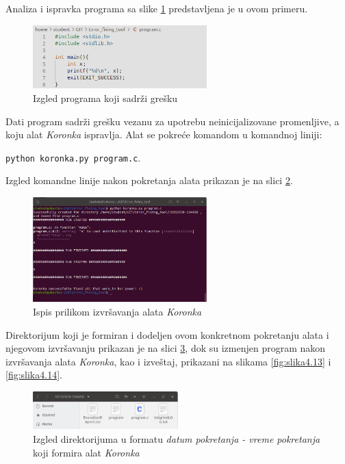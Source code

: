 \documentclass[12pt,oneside]{memoir}
\theoremstyle{plain}
\theoremstyle{definition}
\begin{document}
Analiza i ispravka programa sa slike \ref{fig:slika4.15} predstavljena je u ovom primeru. 

\begin{figure}[!ht]
  \centering
  \includegraphics[width=0.6\textwidth]{ProgramWithError.png}
  \caption{Izgled programa koji sadrži grešku}
  \label{fig:slika4.15}
\end{figure}

Dati program sadrži grešku vezanu za upotrebu neinicijalizovane promenljive, a koju alat \textit{Koronka} ispravlja. Alat se pokreće komandom u komandnoj liniji:
\begin{center}
\texttt{python koronka.py program.c}.
\end{center}

Izgled komandne linije nakon pokretanja alata prikazan je na slici \ref{fig:slika4.11}. 
\begin{figure}[!ht]
  \centering
  \includegraphics[width=0.6\textwidth]{TerminalOutput.png}
  \caption{Ispis prilikom izvršavanja alata \textit{Koronka}}
  \label{fig:slika4.11}
\end{figure}

Direktorijum koji je formiran i dodeljen ovom konkretnom pokretanju alata i njegovom izvršavanju prikazan je na slici \ref{fig:slika4.12}, dok su izmenjen program nakon izvršavanja alata \textit{Koronka}, kao i izveštaj, prikazani na slikama \ref{fig:slika4.13} i \ref{fig:slika4.14}.
\begin{figure}[!ht]
  \centering
  \includegraphics[width=0.5\textwidth]{DateTimeFolder.png}
  \caption{Izgled direktorijuma u formatu \textit{datum pokretanja - vreme pokretanja} koji formira alat \textit{Koronka}}
  \label{fig:slika4.12}
\end{figure}
\end{document}
